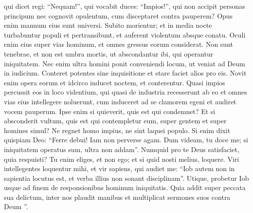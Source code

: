 \begin{biblechapter}
\begin{biblechapter}
\begin{biblechapter}
\begin{biblechapter}
\begin{biblechapter}
\begin{biblechapter}
\begin{biblechapter}
\begin{biblechapter}
\begin{biblechapter}
\begin{biblechapter}
\begin{biblechapter}
\begin{biblechapter}
\begin{biblechapter}
\begin{biblechapter}
\begin{biblechapter}
\begin{biblechapter}
\begin{biblechapter}
\begin{biblechapter}
\begin{biblechapter}
\begin{biblechapter}
\begin{biblechapter}
\begin{biblechapter}
\begin{biblechapter}
\begin{biblechapter}
\begin{biblechapter}
\begin{biblechapter}
\begin{biblechapter}
\begin{biblechapter}
\begin{biblechapter}
\begin{biblechapter}
\begin{biblechapter}
\begin{biblechapter}
\begin{biblechapter}
\begin{biblechapter}
 \verse qui dicet regi: “Nequam!”,
 qui vocabit duces: “Impios!”,
 \verse qui non accipit personas principum
 nec cognovit opulentum,
 cum disceptaret contra pauperem?
 Opus enim manuum eius sunt universi.
 \verse Subito morientur; et in media nocte
 turbabuntur populi et pertransibunt,
 et auferent violentum absque conatu.
 \verse Oculi enim eius super vias hominum,
 et omnes gressus eorum considerat.
 \verse Non sunt tenebrae, et non est umbra mortis,
 ut abscondantur ibi, qui operantur iniquitatem.
 \verse Nec enim ultra homini ponit conveniendi locum,
 ut veniat ad Deum in iudicium.
 \verse Conteret potentes sine inquisitione
 et stare faciet alios pro eis.
 \verse Novit enim opera eorum
 et idcirco inducet noctem, et conterentur.
 \verse Quasi impios percussit eos
 in loco videntium,
 \verse qui quasi de industria recesserunt ab eo
 et omnes vias eius intellegere noluerunt,
 \verse cum induceret ad se clamorem egeni et audiret vocem pauperum.
 \verse Ipse enim si quieverit, quis est qui condemnet?
 Et si absconderit vultum, quis est qui contempletur eum,
 super gentem et super homines simul?
 \verse Ne regnet homo impius,
 ne sint laquei populo.
 \verse Si enim dixit quispiam Deo:
 “Ferre debui! Iam non perverse agam.
 \verse Dum videam, tu doce me;
 si iniquitatem operatus sum, ultra non addam”.
 \verse Numquid pro te Deus satisfaciet,
 quia respuisti?
 Tu enim eliges, et non ego;
 et si quid nosti melius, loquere.
 \verse Viri intellegentes loquentur mihi,
 et vir sapiens, qui audiet me:
 \verse “Iob autem non in sapientia locutus est,
 et verba illius non sonant disciplinam”.
 \verse Utique, probetur Iob usque ad finem
 de responsionibus hominum iniquitatis.
 \verse Quia addit super peccata sua delictum,
 inter nos plaudit manibus
 et multiplicat sermones suos contra Deum ”.
 

\end{biblechapter}
\end{biblechapter}
\end{biblechapter}
\end{biblechapter}
\end{biblechapter}
\end{biblechapter}
\end{biblechapter}
\end{biblechapter}
\end{biblechapter}
\end{biblechapter}
\end{biblechapter}
\end{biblechapter}
\end{biblechapter}
\end{biblechapter}
\end{biblechapter}
\end{biblechapter}
\end{biblechapter}
\end{biblechapter}
\end{biblechapter}
\end{biblechapter}
\end{biblechapter}
\end{biblechapter}
\end{biblechapter}
\end{biblechapter}
\end{biblechapter}
\end{biblechapter}
\end{biblechapter}
\end{biblechapter}
\end{biblechapter}
\end{biblechapter}
\end{biblechapter}
\end{biblechapter}
\end{biblechapter}
\end{biblechapter}
